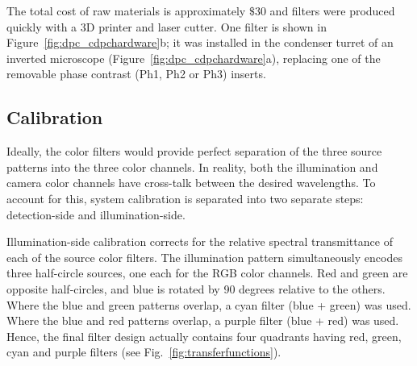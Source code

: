 The total cost of raw materials is approximately $\$30$ and filters were produced quickly with a 3D printer and laser cutter. One filter is shown in Figure~\ref{fig:dpc_cdpchardware}b; it was installed in the condenser turret of an inverted microscope (Figure~\ref{fig:dpc_cdpchardware}a), replacing one of the removable phase contrast (Ph1, Ph2 or Ph3) inserts.
\subsection{Calibration}
\label{Calibration}

Ideally, the color filters would provide perfect separation of the three source patterns into the three color channels. In reality, both the illumination and camera color channels have cross-talk between the desired wavelengths. To account for this, system calibration is separated into two separate steps: detection-side and illumination-side.

Illumination-side calibration corrects for the relative spectral transmittance of each of the source color filters. The illumination pattern simultaneously encodes three half-circle sources, one each for the RGB color channels. Red and green are opposite half-circles, and blue is rotated by 90 degrees relative to the others. Where the blue and green patterns overlap, a cyan filter (blue + green) was used. Where the blue and red patterns overlap, a purple filter (blue + red) was used. Hence, the final filter design actually contains four quadrants having red, green, cyan and purple filters (see Fig.~\ref{fig:transferfunctions}).

